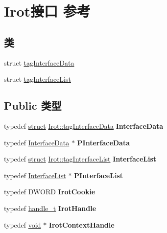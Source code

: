 \hypertarget{interface_irot}{}\section{Irot接口 参考}
\label{interface_irot}
\subsection*{类}
\begin{DoxyCompactItemize}
\item 
struct \hyperlink{struct_irot_1_1tag_interface_data}{tag\+Interface\+Data}
\item 
struct \hyperlink{struct_irot_1_1tag_interface_list}{tag\+Interface\+List}
\end{DoxyCompactItemize}
\subsection*{Public 类型}
\begin{DoxyCompactItemize}
\item 
\mbox{\label{interface_irot_aefec38f4934dccb90f6250cb32088586}} 
typedef \hyperlink{interfacestruct}{struct} \hyperlink{struct_irot_1_1tag_interface_data}{Irot\+::tag\+Interface\+Data} {\bfseries Interface\+Data}
\item 
\mbox{\label{interface_irot_a2a27b4dabf5d84b8dfe8abeaebbedb4d}} 
typedef \hyperlink{struct_irot_1_1tag_interface_data}{Interface\+Data} $\ast$ {\bfseries P\+Interface\+Data}
\item 
\mbox{\label{interface_irot_ab9c461436eb04d85dde166bdddd452ff}} 
typedef \hyperlink{interfacestruct}{struct} \hyperlink{struct_irot_1_1tag_interface_list}{Irot\+::tag\+Interface\+List} {\bfseries Interface\+List}
\item 
\mbox{\label{interface_irot_aba0d3b6b7addb52dd4fb4bb8a73df776}} 
typedef \hyperlink{struct_irot_1_1tag_interface_list}{Interface\+List} $\ast$ {\bfseries P\+Interface\+List}
\item 
\mbox{\label{interface_irot_a3702d82efc1d96be76541969f2e6dbef}} 
typedef D\+W\+O\+RD {\bfseries Irot\+Cookie}
\item 
\mbox{\label{interface_irot_a413196123aaaa34171e36f72a25b8705}} 
typedef \hyperlink{interfacevoid}{handle\+\_\+t} {\bfseries Irot\+Handle}
\item 
\mbox{\label{interface_irot_aca7e08b938175c6e8f5eb6a9fe69ff1c}} 
typedef \hyperlink{interfacevoid}{void} $\ast$ {\bfseries Irot\+Context\+Handle}
\end{DoxyCompactItemize}
